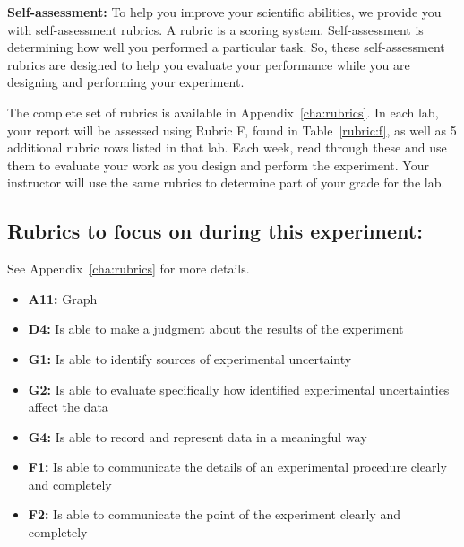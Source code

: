 \begin{framed}
	\textbf{Self-assessment:} To help you improve your scientific abilities, we provide you with self-assessment rubrics.
	A rubric is a scoring system.
	Self-assessment is determining how well you performed a particular task.
	So, these self-assessment rubrics are designed to help you evaluate your performance while you are designing and performing your experiment.
	
	The complete set of rubrics is available in Appendix~\ref{cha:rubrics}.
	In each lab, your report will be assessed using Rubric F, found in Table~\ref{rubric:f}, as well as 5 additional rubric rows listed in that lab.
	Each week, read through these and use them to evaluate your work as you design and perform the experiment.
	Your instructor will use the same rubrics to determine part of your grade for the lab.
\end{framed}	

\subsection{Rubrics to focus on during this experiment:}

See Appendix~\ref{cha:rubrics} for more details.

\begin{itemize}
\item \textbf{A11:} Graph

\item \textbf{D4:} Is able to make a judgment about the results of the experiment

\item \textbf{G1:} Is able to identify sources of experimental uncertainty

\item \textbf{G2:} Is able to evaluate specifically how identified experimental uncertainties affect the data

\item \textbf{G4:} Is able to record and represent data in a meaningful way

\item \textbf{F1:} Is able to communicate the details of an experimental procedure clearly and completely

\item \textbf{F2:} Is able to communicate the point of the experiment clearly and completely

\end{itemize}

